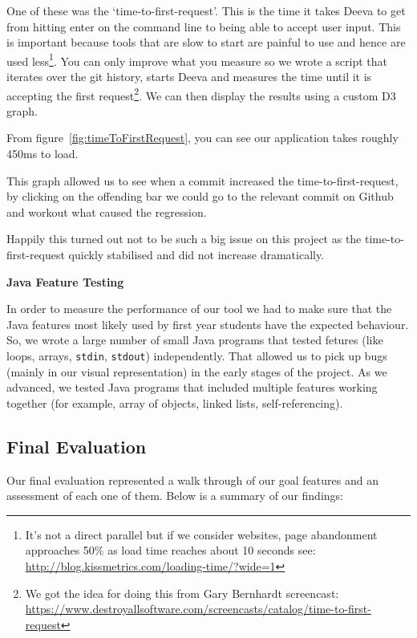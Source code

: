 \documentclass[11pt, a4paper]{article}
\newcommand{\cmd}[1]{{\tt #1}}
\begin{document}
One of these was the `time-to-first-request'.
This is the time it takes Deeva to get from hitting enter on the command line to being able to accept user input.
This is important because tools that are slow to start are painful to use and hence are used less\footnote{It's not a direct parallel but if we consider websites, page abandonment approaches 50\% as load time reaches about 10 seconds see: \url{http://blog.kissmetrics.com/loading-time/?wide=1}}.
You can only improve what you measure so we wrote a script that iterates over the git history, starts Deeva and measures the time until it is accepting the first request\footnote{We got the idea for doing this from Gary Bernhardt screencast: \url{https://www.destroyallsoftware.com/screencasts/catalog/time-to-first-request}}.
We can then display the results using a custom D3 graph.

From figure~\ref{fig:timeToFirstRequest}, you can see our application takes roughly 450ms to load.

This graph allowed us to see when a commit increased the time-to-first-request, by clicking on the offending bar we could go to the relevant commit on Github and workout what caused the regression.

Happily this turned out not to be such a big issue on this project as the time-to-first-request quickly stabilised and did not increase dramatically.

\textbf{Java Feature Testing}

In order to measure the performance of our tool we had to make sure that the Java features most likely used by first year students have the expected behaviour.
So, we wrote a large number of small Java programs that tested fetures (like loops, arrays, \cmd{stdin}, \cmd{stdout}) independently.
That allowed us to pick up bugs (mainly in our visual representation) in the early stages of the project.
As we advanced, we tested Java programs that included multiple features working together (for example, array of objects, linked lists, self-referencing).

\subsection{Final Evaluation}
Our final evaluation represented a walk through of our goal features and an assessment of each one of them.
Below is a summary of our findings:
\end{document}
